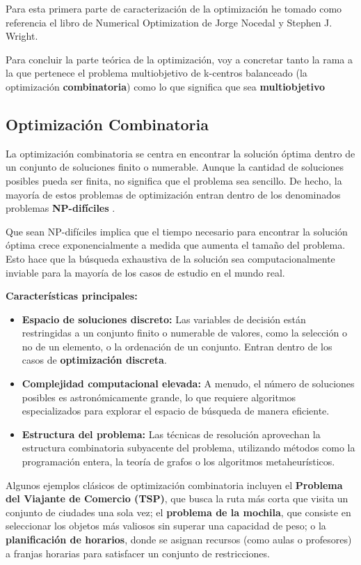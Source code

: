\documentclass[12pt,a4paper]{book}
\begin{document}
Para esta primera parte de caracterización de la optimización he tomado como referencia el libro \cite{Numerical_optimization_nocedal_wright} de Numerical Optimization de Jorge Nocedal y Stephen J. Wright.

Para concluir la parte teórica de la optimización, voy a concretar tanto la rama a la que pertenece el problema multiobjetivo de k-centros balanceado (la optimización \textbf{combinatoria}) como lo que significa que sea \textbf{multiobjetivo}

\subsection{Optimización Combinatoria}
La optimización combinatoria se centra en encontrar la solución óptima dentro de un conjunto de soluciones finito o numerable. Aunque la cantidad de soluciones posibles pueda ser finita, no significa que el problema sea sencillo.
De hecho, la mayoría de estos problemas de optimización entran dentro de los denominados problemas \textbf{NP-difíciles} \cite{np_hard}.

Que sean NP-difíciles implica que el tiempo necesario para encontrar la solución óptima crece exponencialmente a medida que aumenta el tamaño del problema. Esto hace que la búsqueda exhaustiva de la solución sea computacionalmente inviable para la mayoría de los casos de estudio en el mundo real.

\textbf{Características principales:}
\begin{itemize}
    \item \textbf{Espacio de soluciones discreto:} Las variables de decisión están restringidas a un conjunto finito o numerable de valores, como la selección o no de un elemento, o la ordenación de un conjunto. Entran dentro de los casos de \textbf{optimización discreta}. 
    \item \textbf{Complejidad computacional elevada:} A menudo, el número de soluciones posibles es astronómicamente grande, lo que requiere algoritmos especializados para explorar el espacio de búsqueda de manera eficiente.
    \item \textbf{Estructura del problema:} Las técnicas de resolución aprovechan la estructura combinatoria subyacente del problema, utilizando métodos como la programación entera, la teoría de grafos o los algoritmos metaheurísticos.
\end{itemize}

Algunos ejemplos clásicos de optimización combinatoria incluyen el \textbf{Problema del Viajante de Comercio (TSP)}, 
que busca la ruta más corta que visita un conjunto de ciudades una sola vez;
el \textbf{problema de la mochila}, que consiste en seleccionar los objetos más valiosos sin superar una capacidad de peso;
o la \textbf{planificación de horarios}, donde se asignan recursos (como aulas o profesores) a franjas horarias para satisfacer un conjunto de restricciones.
\end{document}
